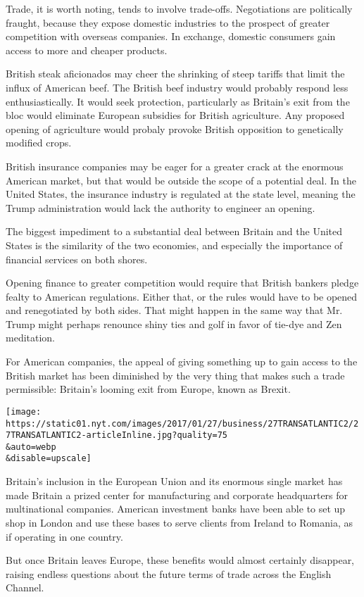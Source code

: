 Trade, it is worth noting, tends to involve trade-offs. Negotiations are
politically fraught, because they expose domestic industries to the
prospect of greater competition with overseas companies. In exchange,
domestic consumers gain access to more and cheaper products.

British steak aficionados may cheer the shrinking of steep tariffs that
limit the influx of American beef. The British beef industry would
probably respond less enthusiastically. It would seek protection,
particularly as Britain's exit from the bloc would eliminate European
subsidies for British agriculture. Any proposed opening of agriculture
would probaly provoke British opposition to genetically modified crops.

British insurance companies may be eager for a greater crack at the
enormous American market, but that would be outside the scope of a
potential deal. In the United States, the insurance industry is
regulated at the state level, meaning the Trump administration would
lack the authority to engineer an opening.

The biggest impediment to a substantial deal between Britain and the
United States is the similarity of the two economies, and especially the
importance of financial services on both shores.

Opening finance to greater competition would require that British
bankers pledge fealty to American regulations. Either that, or the rules
would have to be opened and renegotiated by both sides. That might
happen in the same way that Mr. Trump might perhaps renounce shiny ties
and golf in favor of tie-dye and Zen meditation.

For American companies, the appeal of giving something up to gain access
to the British market has been diminished by the very thing that makes
such a trade permissible: Britain's looming exit from Europe, known as
Brexit.

\texttt{[image: https://static01.nyt.com/images/2017/01/27/business/27TRANSATLANTIC2/27TRANSATLANTIC2-articleInline.jpg?quality=75\\\&auto=webp\\\&disable=upscale]}

Britain's inclusion in the European Union and its enormous single market
has made Britain a prized center for manufacturing and corporate
headquarters for multinational companies. American investment banks have
been able to set up shop in London and use these bases to serve clients
from Ireland to Romania, as if operating in one country.

But once Britain leaves Europe, these benefits would almost certainly
disappear, raising endless questions about the future terms of trade
across the English Channel.

